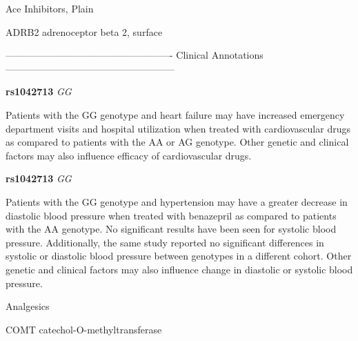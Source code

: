 \documentclass{resume} %
\begin{document}
\begin{rSection}{ Ace Inhibitors, Plain }
\item[]

\begin{rSubsection}{ ADRB2 }{ adrenoceptor beta 2, surface }{}{}
\item[]

\item[] ---------------------------------------------------- Clinical Annotations -----------------------------------------------------\newline
\item \textbf{ rs1042713 } \textit{ GG }
\item[] Patients with the GG genotype and heart failure may have increased emergency department visits and hospital utilization when treated with cardiovascular drugs as compared to patients with the AA or AG genotype. Other genetic and clinical factors may also influence efficacy of cardiovascular drugs.\item \textbf{ rs1042713 } \textit{ GG }
\item[] Patients with the GG genotype and hypertension may have a greater decrease in diastolic blood pressure when treated with benazepril as compared to patients with the AA genotype. No significant results have been seen for systolic blood pressure. Additionally, the same study reported no significant differences in systolic or diastolic blood pressure between genotypes in a different cohort. Other genetic and clinical factors may also influence change in diastolic or systolic blood pressure.
\end{rSubsection}

\end{rSection}\begin{rSection}{ Analgesics }
\item[]

\begin{rSubsection}{ COMT }{ catechol-O-methyltransferase }{}{}
\item[]


\end{rSubsection}
\end{rSection}
\end{document}
